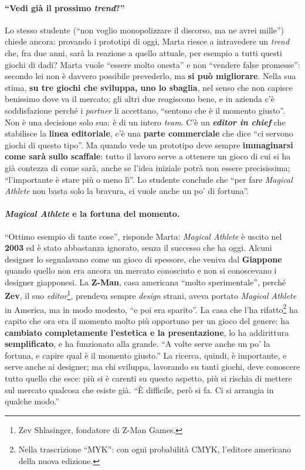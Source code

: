 \paragraph{``Vedi già il prossimo \emph{trend}?''} Lo stesso studente (``non voglio
monopolizzare il discorso, ma ne avrei mille'') chiede ancora: provando i prototipi di
oggi, Marta riesce a intravedere un \emph{trend} che, fra due anni, sarà la reazione a
quello attuale, per esempio a tutti questi giochi di dadi? Marta vuole ``essere molto
onesta'' e non ``vendere false promesse'': secondo lei non è davvero possibile prevederlo,
ma \textbf{si può migliorare}. Nella sua stima, \textbf{su tre giochi che sviluppa, uno lo
sbaglia}, nel senso che non capisce benissimo dove va il mercato; gli altri due reagiscono
bene, e in azienda c'è soddisfazione perché i \emph{partner} li accettano, ``sentono che è
il momento giusto''. Non è una decisione solo sua: è di un intero \emph{team}. C'è un
\textbf{\emph{editor in chief}} che stabilisce la \textbf{linea editoriale}, c'è una
\textbf{parte commerciale} che dice ``ci servono giochi di questo tipo''. Ma quando vede un
prototipo deve sempre \textbf{immaginarsi come sarà sullo scaffale}: tutto il lavoro serve
a ottenere un gioco di cui si ha già contezza di come sarà, anche se l'idea iniziale potrà
non essere precisissima; ``l'importante è stare più o meno lì''. Lo studente conclude che
``per fare \emph{Magical Athlete} non basta solo la bravura, ci vuole anche un po' di
fortuna''.

\paragraph{\emph{Magical Athlete} e la fortuna del momento.} ``Ottimo esempio di tante
cose'', risponde Marta: \emph{Magical Athlete} è uscito nel \textbf{2003} ed è stato
abbastanza ignorato, senza il successo che ha oggi. Alcuni designer lo segnalavano come un
gioco di spessore, che veniva dal \textbf{Giappone} quando quello non era ancora un mercato
conosciuto e non si conoscevano i designer giapponesi. La \textbf{Z-Man}, casa americana
``molto sperimentale'', perché \textbf{Zev}, il suo \emph{editor}\footnote{Zev
Shlasinger, fondatore di Z-Man Games.}, prendeva sempre \emph{design} strani, aveva portato
\emph{Magical Athlete} in America, ma in modo modesto, ``e poi era sparito''. La casa che
l'ha rifatto\footnote{Nella trascrizione ``MYK'': con ogni probabilità CMYK, l'editore
americano della nuova edizione.} ha capito che ora era il momento molto più opportuno per
un gioco del genere: ha \textbf{cambiato completamente l'estetica e la presentazione}, lo
ha addirittura \textbf{semplificato}, e ha funzionato alla grande. ``A volte serve anche un
po' la fortuna, e capire qual è il momento giusto.'' La ricerca, quindi, è importante, e
serve anche ai designer; ma chi sviluppa, lavorando su tanti giochi, deve conoscere tutto
quello che esce: più si è carenti su questo aspetto, più si rischia di mettere sul mercato
qualcosa che esiste già. ``È difficile, però si fa. Ci si arrangia in qualche modo.''

